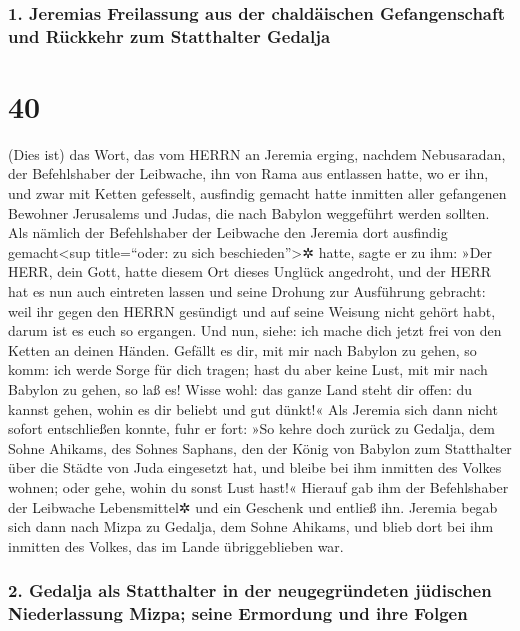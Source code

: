 \hypertarget{jeremias-freilassung-aus-der-chalduxe4ischen-gefangenschaft-und-ruxfcckkehr-zum-statthalter-gedalja}{%
\subsubsection{1. Jeremias Freilassung aus der chaldäischen
Gefangenschaft und Rückkehr zum Statthalter
Gedalja}\label{jeremias-freilassung-aus-der-chalduxe4ischen-gefangenschaft-und-ruxfcckkehr-zum-statthalter-gedalja}}

\hypertarget{section-39}{%
\section{40}\label{section-39}}

(Dies ist) das Wort, das vom HERRN an Jeremia erging,
nachdem Nebusaradan, der Befehlshaber der Leibwache, ihn von Rama aus
entlassen hatte, wo er ihn, und zwar mit Ketten gefesselt, ausfindig
gemacht hatte inmitten aller gefangenen Bewohner Jerusalems und Judas,
die nach Babylon weggeführt werden sollten. Als nämlich
der Befehlshaber der Leibwache den Jeremia dort ausfindig
gemacht\textless sup title=``oder: zu sich beschieden''\textgreater✲
hatte, sagte er zu ihm: »Der HERR, dein Gott, hatte diesem Ort dieses
Unglück angedroht, und der HERR hat es nun auch eintreten
lassen und seine Drohung zur Ausführung gebracht: weil ihr gegen den
HERRN gesündigt und auf seine Weisung nicht gehört habt, darum ist es
euch so ergangen. Und nun, siehe: ich mache dich jetzt
frei von den Ketten an deinen Händen. Gefällt es dir, mit mir nach
Babylon zu gehen, so komm: ich werde Sorge für dich tragen; hast du aber
keine Lust, mit mir nach Babylon zu gehen, so laß es! Wisse wohl: das
ganze Land steht dir offen: du kannst gehen, wohin es dir beliebt und
gut dünkt!« Als Jeremia sich dann nicht sofort
entschließen konnte, fuhr er fort: »So kehre doch zurück zu Gedalja, dem
Sohne Ahikams, des Sohnes Saphans, den der König von Babylon zum
Statthalter über die Städte von Juda eingesetzt hat, und bleibe bei ihm
inmitten des Volkes wohnen; oder gehe, wohin du sonst Lust hast!«
Hierauf gab ihm der Befehlshaber der Leibwache Lebensmittel✲ und ein
Geschenk und entließ ihn. Jeremia begab sich dann nach
Mizpa zu Gedalja, dem Sohne Ahikams, und blieb dort bei ihm inmitten des
Volkes, das im Lande übriggeblieben war.

\hypertarget{gedalja-als-statthalter-in-der-neugegruxfcndeten-juxfcdischen-niederlassung-mizpa-seine-ermordung-und-ihre-folgen}{%
\subsubsection{2. Gedalja als Statthalter in der neugegründeten
jüdischen Niederlassung Mizpa; seine Ermordung und ihre
Folgen}\label{gedalja-als-statthalter-in-der-neugegruxfcndeten-juxfcdischen-niederlassung-mizpa-seine-ermordung-und-ihre-folgen}}

